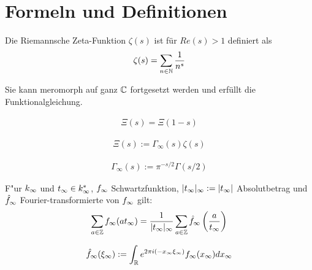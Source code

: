 \section{Formeln und Definitionen}
\label{sec:riemann2}

\begin{defi}
	\label{def:zeta}
	Die Riemannsche Zeta-Funktion $\zeta(s)$  ist für $Re(s)>1$ definiert als
	\begin{align}
		\zeta (s) = \sum_{n\in \mathbb{N}} \frac{1}{n^s}
	\end{align}
\end{defi}
Sie kann meromorph auf ganz $\mathbb{C}$ fortgesetzt werden und erfüllt die Funktionalgleichung.
\begin{satz}
	\label{eq:funktionalgleichung}
	\begin{align}
		 \Xi(s) = \Xi(1-s)
	\end{align}
\end{satz}


\begin{defi}
	\label{def:xi}
	\begin{align}
		\Xi(s) := \Gamma_\infty(s) \zeta(s)
	\end{align}
\end{defi}



\begin{defi}
	\label{def:gamma_infty}
	\begin{align}
		\Gamma_\infty(s) := \pi^{-s/2} \Gamma(s/2)
	\end{align}
\end{defi}

\begin{satz}
	\label{satz:poisson}
	F"ur $k_\infty$ und $t_\infty \in k_\infty^*$, $f_\infty$ Schwartzfunktion, $|t_\infty|_\infty := |t_\infty|$ Absolutbetrag und $\hat{f}_\infty$ Fourier-transformierte von $f_\infty$ gilt:
	\begin{align}
		\sum_{a \in \mathbb{Z}} f_\infty (a t_\infty) = \frac{1}{|t_\infty|_\infty} \sum_{a \in \mathbb{Z}} \hat{f}_\infty \left( \frac{a} {t_\infty} \right)
	\end{align}
\end{satz}

\begin{defi}[Fouriertransformation]
	\label{def:fourier}
	\begin{align}
		\hat{f}_\infty(\xi_\infty) := \int_{\mathbb{R}}{e^{ 2\pi i (-x_\infty\xi_\infty) }f_\infty(x_\infty)dx_\infty}
	\end{align}
\end{defi}


